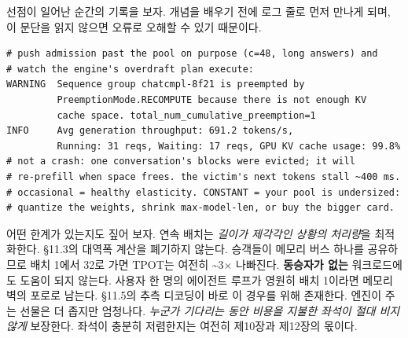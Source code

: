 선점이 일어난 순간의 기록을 보자. 개념을 배우기 전에 로그 줄로 먼저 만나게 되며, 이 문단을 읽지 않으면 오류로 오해할 수 있기 때문이다.

\begin{terminalbox}
\begin{Verbatim}[breaklines=true,breakanywhere=true,fontsize=\small,formatcom=\color{tbbtermfg},codes=\tbbcodeactive]
# push admission past the pool on purpose (c=48, long answers) and
# watch the engine's overdraft plan execute:
WARNING  Sequence group chatcmpl-8f21 is preempted by
         PreemptionMode.RECOMPUTE because there is not enough KV
         cache space. total_num_cumulative_preemption=1
INFO     Avg generation throughput: 691.2 tokens/s,
         Running: 31 reqs, Waiting: 17 reqs, GPU KV cache usage: 99.8%
# not a crash: one conversation's blocks were evicted; it will
# re-prefill when space frees. the victim's next tokens stall ~400 ms.
# occasional = healthy elasticity. CONSTANT = your pool is undersized:
# quantize the weights, shrink max-model-len, or buy the bigger card.
\end{Verbatim}
\end{terminalbox}

어떤 한계가 있는지도 짚어 보자. 연속 배치는 \textit{길이가 제각각인 상황의 처리량}을 최적화한다. §11.3의 대역폭 계산을 폐기하지 않는다. 승객들이 메모리 버스 하나를 공유하므로 배치 1에서 32로 가면 TPOT는 여전히 \textasciitilde{}3× 나빠진다. \textbf{동승자가 없는} 워크로드에도 도움이 되지 않는다. 사용자 한 명의 에이전트 루프가 영원히 배치 1이라면 메모리 벽의 포로로 남는다. §11.5의 추측 디코딩이 바로 이 경우를 위해 존재한다. 엔진이 주는 선물은 더 좁지만 엄청나다. \textit{누군가 기다리는 동안 비용을 지불한 좌석이 절대 비지 않게} 보장한다. 좌석이 충분히 저렴한지는 여전히 제10장과 제12장의 몫이다.

